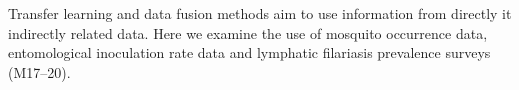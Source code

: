 \documentclass{bmcart}
\begin{document}

Transfer learning and data fusion methods aim to use information from directly it indirectly related data.
Here we examine the use of mosquito occurrence data, entomological inoculation rate data and lymphatic filariasis prevalence surveys (M17--20).










\end{document}
